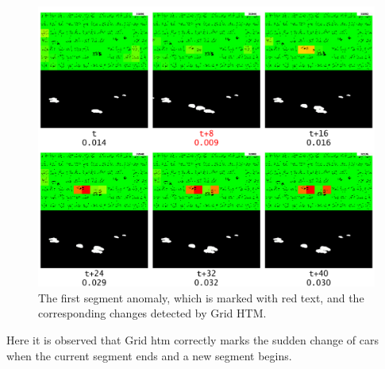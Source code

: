 \begin{figure}[H]
    \centering
    \includegraphics[width=\textwidth]{resources/experiments/surveillance/surveillance_anomaly_1.png}
    \caption[Segment Anomaly]{The first segment anomaly, which is marked with red text,  and the corresponding changes detected by Grid HTM.}
    \label{fig:surveillance_segment}
\end{figure}
Here it is observed that Grid \gls*{htm} correctly marks the sudden change of cars when the current segment ends and a new segment begins.
